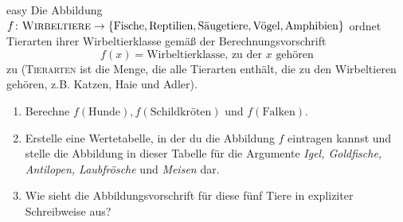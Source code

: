 \documentclass[../abbildungen.tex]{subfiles}
\begin{document}
\begin{exercise}{easy}
    Die Abbildung $f\colon\textsc{Wirbeltiere}\rightarrow\{\text{Fische},\text{Reptilien},\text{Säugetiere},\text{Vögel},\text{Amphibien}\}$ ordnet Tierarten ihrer Wirbeltierklasse gemäß der Berechnungsvorschrift
    \[f(x)=\text{Wirbeltierklasse, zu der $x$ gehören}\]
    zu (\textsc{Tierarten} ist die Menge, die alle Tierarten enthält, die zu den Wirbeltieren gehören, z.B. Katzen, Haie und Adler).
    \begin{enumerate}
        \item Berechne $f(\text{Hunde}), f(\text{Schildkröten})$ und $f(\text{Falken})$.
        \item Erstelle eine Wertetabelle, in der du die Abbildung $f$ eintragen kannst und stelle die Abbildung in dieser Tabelle für die Argumente \emph{Igel, Goldfische, Antilopen, Laubfrösche} und \emph{Meisen} dar.
        \item Wie sieht die Abbildungsvorschrift für diese fünf Tiere in expliziter Schreibweise aus?
    \end{enumerate}
\end{exercise}
\end{document}
